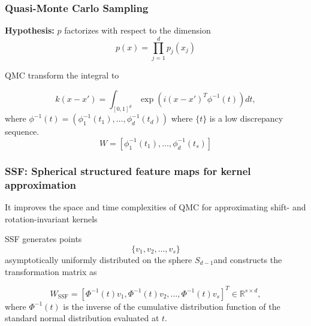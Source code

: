 \begin{frame}
  \frametitle{Quasi-Monte Carlo Sampling}

  \textbf{Hypothesis:} $p$ factorizes with respect to the dimension
  \begin{equation*}
    p(x) = \prod_{j=1}^d p_j(x_j)
  \end{equation*}

  QMC transform the integral to 

  \begin{equation*}
    k(x - x')
    = 
    \int_{[0,1]^d}
    \exp(
      i(x-x')^T
      \phi^{-1}(t)
    ) dt,
  \end{equation*}
  where $\phi^{-1}(t) = (\phi_1^{-1}(t_1), \ldots, \phi_d^{-1}(t_d))$
  where $\{t\}$ is a low discrepancy sequence. 
  \begin{equation*}
    W = [\phi_1^{-1}(t_1), \ldots, \phi_d^{-1}(t_s)]
  \end{equation*}
\end{frame}


\begin{frame}
  \frametitle{SSF: Spherical structured feature maps for kernel approximation}
   It improves the space and time complexities of QMC for approximating shift- and rotation-invariant kernels

  SSF generates points  $$\{v_1, v_2, \ldots, v_s\}$$
    asymptotically uniformly distributed on the sphere 
    $S_{d-1}$and constructs the transformation matrix as 
  
  $$W_{\text{SSF}} = \left[\Phi^{-1}(t) v_1, \Phi^{-1}(t) v_2, \ldots, \Phi^{-1}(t) v_s \right]^T \in \mathbb{R}^{s \times d},$$
  where $\Phi^{-1}(t)$ is the inverse of the cumulative distribution function of the standard normal distribution evaluated at $t$.
\end{frame}

